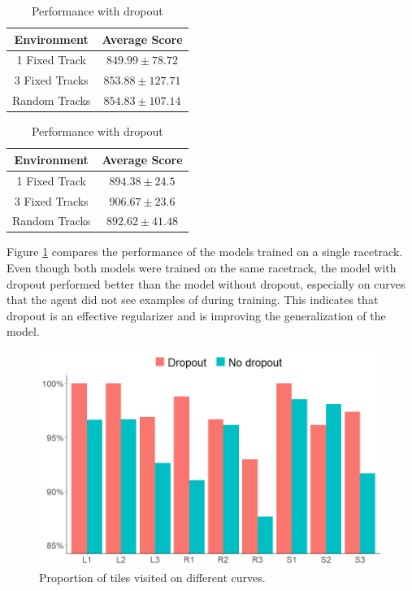 \documentclass{article}
\begin{document}
\begin{table}[h!]
\begin{center}
\begin{minipage}[t]{.4\textwidth}
  \begin{tabular}{c|c}
    \textbf{Environment} & \textbf{Average Score}\\ \hline
    1 Fixed Track & $849.99\pm78.72$ \\
    3 Fixed Tracks & $853.88\pm127.71$ \\
    Random Tracks & $854.83\pm107.14$ \\
  \end{tabular}
  \caption{Performance without dropout}
  \label{tab:base_scores}
\end{minipage}
\hspace{1cm}
\begin{minipage}[t]{.4\textwidth}
  \begin{tabular}{c|c}
    \textbf{Environment} & \textbf{Average Score}\\
    \hline
    1 Fixed Track & $894.38\pm24.5$ \\
    3 Fixed Tracks &  $906.67\pm23.6$ \\
    Random Tracks & $892.62\pm41.48$ \\
  \end{tabular}
  \caption{Performance with dropout}
  \label{tab:drop_scores}
\end{minipage}
\end{center}
\vspace{-5mm}
\end{table}

Figure \ref{fig:curves_comparison} compares the performance of the
models trained on a single racetrack. Even though both models were
trained on the same racetrack, the model with dropout performed better
than the model without dropout, especially on curves that the agent
did not see examples of during training. This indicates that 
dropout is an effective regularizer and is improving the
generalization of the model. 

\begin{figure}[!h]
\captionsetup{justification=centering}
\centering
\includegraphics[width=.55\linewidth]{Graphics/curve_plot_v2.png}
\caption{Proportion of tiles visited on different curves. }
\label{fig:curves_comparison}
\vspace{-4mm}
\end{figure}
\end{document}
